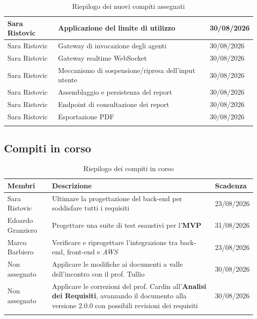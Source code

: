 \documentclass[12pt, a4paper]{article}
\begin{document}
\begin{xltabular}{\textwidth}{|l|X|l|}
    Sara Ristovic & Applicazione del limite di utilizzo & 30/08/2026 \\ \hline
    Sara Ristovic & Gateway di invocazione degli agenti & 30/08/2026 \\ \hline
    Sara Ristovic & Gateway realtime WebSocket & 30/08/2026 \\ \hline
    Sara Ristovic & Meccanismo di sospensione/ripresa dell'input utente & 30/08/2026 \\ \hline
    Sara Ristovic & Assemblaggio e persistenza del report & 30/08/2026 \\ \hline
    Sara Ristovic & Endpoint di consultazione dei report & 30/08/2026 \\ \hline
    Sara Ristovic & Esportazione PDF & 30/08/2026 \\ \hline
    \caption{Riepilogo dei nuovi compiti assegnati} \\
\end{xltabular}

\subsection{Compiti in corso}

\renewcommand{\arraystretch}{1.3}
\begin{xltabular}{\textwidth}{|l|X|l|}
    
    \hline
    \textbf{Membri} & \textbf{Descrizione} & \textbf{Scadenza} \\ \hline
    \endfirsthead

    \endlastfoot

    Sara Ristovic & Ultimare la progettazione del back-end per soddisfare tutti i requisiti & 23/08/2026 \\ \hline
    Edoardo Granziero & Progettare una suite di test esaustivi per l'\textbf{MVP} & 31/08/2026 \\ \hline
    Marco Barbiero & Verificare e riprogettare l'integrazione tra back-end, front-end e \textit{AWS} & 23/08/2026 \\ \hline
    Non assegnato & Applicare le modifiche ai documenti a valle dell'incontro con il prof. Tullio & 30/08/2026 \\ \hline
    Non assegnato & Applicare le correzioni del prof. Cardin all'\textbf{Analisi dei Requisiti}, avanzando il documento alla versione 2.0.0 con possibili revisioni dei requisiti & 30/08/2026 \\ \hline



    
    \caption{Riepilogo dei compiti in corso} \\
\end{xltabular}
\end{document}
